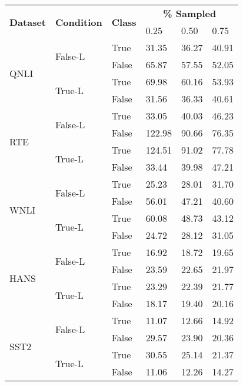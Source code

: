\begin{table*}[h!]
\centering
\small
\begin{tabular}{llllll}
  \toprule
  \multirow{2}{*}{\textbf{Dataset}} & \multirow{2}{*}{\textbf{Condition}} & \multirow{2}{*}{\textbf{Class}} & \multicolumn{3}{c}{\textbf{\% Sampled}}\\
  \cmidrule{4-6}
  & & & 0.25 & 0.50 & 0.75 \\
  \midrule
  \multirow{4}{*}{QNLI} & \multirow{2}{*}{False-L} & True & 31.35 & 36.27 & 40.91\\
  \cmidrule{3-6}
  & & False & 65.87 & 57.55 & 52.05\\
  \cmidrule{2-6}
  & \multirow{2}{*}{True-L} & True & 69.98 & 60.16 & 53.93\\
  \cmidrule{3-6}
  & & False & 31.56 & 36.33 & 40.61\\  
  \midrule
  \multirow{4}{*}{RTE} & \multirow{2}{*}{False-L} & True & 33.05 & 40.03 & 46.23\\
  \cmidrule{3-6}
  & & False & 122.98 & 90.66 & 76.35\\
  \cmidrule{2-6}
  & \multirow{2}{*}{True-L} & True & 124.51 & 91.02 & 77.78\\
  \cmidrule{3-6}
  & & False & 33.44 & 39.98 & 47.21\\  
  \midrule
  \multirow{4}{*}{WNLI} & \multirow{2}{*}{False-L} & True & 25.23 & 28.01 & 31.70\\
  \cmidrule{3-6}
  & & False & 56.01 & 47.21 & 40.60\\
  \cmidrule{2-6}
  & \multirow{2}{*}{True-L} & True & 60.08 & 48.73 & 43.12\\
  \cmidrule{3-6}
  & & False & 24.72 & 28.12 & 31.05\\  
  \midrule
  \multirow{4}{*}{HANS} & \multirow{2}{*}{False-L} & True & 16.92 & 18.72 & 19.65\\
  \cmidrule{3-6}
  & & False & 23.59 & 22.65 & 21.97\\
  \cmidrule{2-6}
  & \multirow{2}{*}{True-L} & True & 23.29 & 22.39 & 21.77\\
  \cmidrule{3-6}
  & & False & 18.17 & 19.40 & 20.16\\  
  \midrule
  \multirow{4}{*}{SST2} & \multirow{2}{*}{False-L} & True & 11.07 & 12.66 & 14.92\\
  \cmidrule{3-6}
  & & False & 29.57 & 23.90 & 20.36\\
  \cmidrule{2-6}
  & \multirow{2}{*}{True-L} & True & 30.55 & 25.14 & 21.37\\
  \cmidrule{3-6}
  & & False & 11.06 & 12.26 & 14.27\\  

\end{tabular}
\end{table*}
